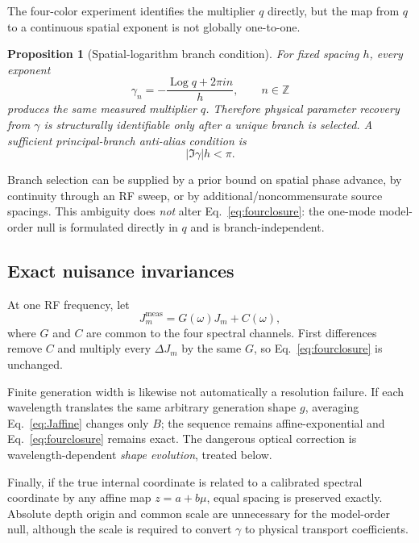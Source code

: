 \documentclass[11pt]{article}
\newtheorem{proposition}{Proposition}
\begin{document}
The four-color experiment identifies the multiplier $q$ directly, but the map from $q$ to a continuous spatial exponent is not globally one-to-one.
\begin{proposition}[Spatial-logarithm branch condition]
For fixed spacing $h$, every exponent
\begin{equation}
\boxed{\gamma_n=-\frac{\operatorname{Log}q+2\pi i n}{h},\qquad n\in\mathbb Z}
\label{eq:spatial_alias}
\end{equation}
produces the same measured multiplier $q$. Therefore physical parameter recovery from $\gamma$ is structurally identifiable only after a unique branch is selected. A sufficient principal-branch anti-alias condition is
\begin{equation}
\boxed{|\Im\gamma|h<\pi.}
\label{eq:spatial_antialias}
\end{equation}
\end{proposition}
Branch selection can be supplied by a prior bound on spatial phase advance, by continuity through an RF sweep, or by additional/noncommensurate source spacings. This ambiguity does \emph{not} alter Eq.~\eqref{eq:fourclosure}: the one-mode model-order null is formulated directly in $q$ and is branch-independent.

\subsection{Exact nuisance invariances}

At one RF frequency, let
\begin{equation}
J_m^{\mathrm{meas}}=G(\omega)J_m+C(\omega),
\end{equation}
where $G$ and $C$ are common to the four spectral channels. First differences remove $C$ and multiply every $\Delta J_m$ by the same $G$, so Eq.~\eqref{eq:fourclosure} is unchanged.

Finite generation width is likewise not automatically a resolution failure. If each wavelength translates the same arbitrary generation shape $g$, averaging Eq.~\eqref{eq:Jaffine} changes only $B$; the sequence remains affine-exponential and Eq.~\eqref{eq:fourclosure} remains exact. The dangerous optical correction is wavelength-dependent \emph{shape evolution}, treated below.

Finally, if the true internal coordinate is related to a calibrated spectral coordinate by any affine map $z=a+b\mu$, equal spacing is preserved exactly. Absolute depth origin and common scale are unnecessary for the model-order null, although the scale is required to convert $\gamma$ to physical transport coefficients.
\end{document}
